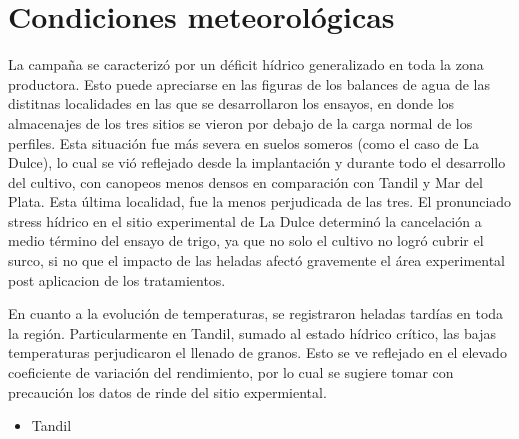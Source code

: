\documentclass[
  letterpaper,
  DIV=11,
  numbers=noendperiod]{scrreprt}
\providecommand{\tightlist}{%
  \setlength{\itemsep}{0pt}\setlength{\parskip}{0pt}}\usepackage{longtable,booktabs,array}
\begin{document}

\hypertarget{condiciones-meteoroluxf3gicas}{%
\chapter*{Condiciones
meteorológicas}\label{condiciones-meteoroluxf3gicas}}


La campaña se caracterizó por un déficit hídrico generalizado en toda la
zona productora. Esto puede apreciarse en las figuras de los balances de
agua de las distitnas localidades en las que se desarrollaron los
ensayos, en donde los almacenajes de los tres sitios se vieron por
debajo de la carga normal de los perfiles. Esta situación fue más severa
en suelos someros (como el caso de La Dulce), lo cual se vió reflejado
desde la implantación y durante todo el desarrollo del cultivo, con
canopeos menos densos en comparación con Tandil y Mar del Plata. Esta
última localidad, fue la menos perjudicada de las tres. El pronunciado
stress hídrico en el sitio experimental de La Dulce determinó la
cancelación a medio término del ensayo de trigo, ya que no solo el
cultivo no logró cubrir el surco, si no que el impacto de las heladas
afectó gravemente el área experimental post aplicacion de los
tratamientos.

En cuanto a la evolución de temperaturas, se registraron heladas tardías
en toda la región. Particularmente en Tandil, sumado al estado hídrico
crítico, las bajas temperaturas perjudicaron el llenado de granos. Esto
se ve reflejado en el elevado coeficiente de variación del rendimiento,
por lo cual se sugiere tomar con precaución los datos de rinde del sitio
expermiental.

\begin{itemize}
\tightlist
\item
  Tandil
\end{itemize}
\end{document}

